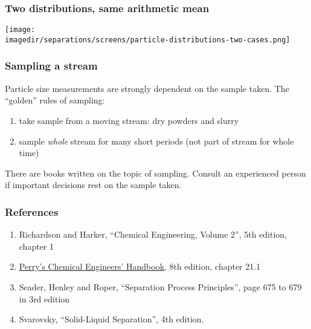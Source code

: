 \begin{frame}\frametitle{Two distributions, same arithmetic mean}
	\begin{center}
		\texttt{[image: \\imagedir/separations/screens/particle-distributions-two-cases.png]}
	\end{center}
\end{frame}

% 

\begin{frame}\frametitle{Sampling a stream}
	Particle size measurements are strongly dependent on the sample taken. The ``golden'' rules of sampling:

	\begin{enumerate}
		\item	take sample from a moving stream: dry powders and slurry
		\item	sample \emph{whole} stream for many short periods (not part of stream for whole time)
	\end{enumerate}

	\vspace{12pt}
	There are books written on the topic of sampling. Consult an experienced person if important decisions rest on the sample taken.
\end{frame}

\begin{frame}\frametitle{References}
	\begin{enumerate}
		\item	Richardson and Harker, ``Chemical Engineering, Volume 2'', 5th edition, chapter 1
		\item	\href{http://accessengineeringlibrary.com/browse/perrys-chemical-engineers-handbook-eighth-edition}{Perry's Chemical Engineers' Handbook}, 8th edition, chapter 21.1
		\item	Seader, Henley and Roper, ``Separation Process Principles'', page 675 to 679 in 3rd edition
		\item	Svarovsky, ``Solid-Liquid Separation'', 4th edition.
	\end{enumerate}
\end{frame}
